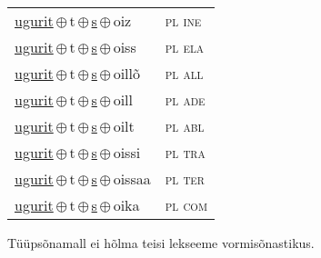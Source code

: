 \begin{minipage}{\textwidth}
\begin{sideways}
\begin{tabular}{l l}
\underline{ugurit}\,$\oplus$\,t\,$\oplus$\,\underline{s}\,$\oplus$\,oiz & \textsc{ pl ine } \\
\underline{ugurit}\,$\oplus$\,t\,$\oplus$\,\underline{s}\,$\oplus$\,oiss & \textsc{ pl ela } \\
\underline{ugurit}\,$\oplus$\,t\,$\oplus$\,\underline{s}\,$\oplus$\,oillõ & \textsc{ pl all } \\
\underline{ugurit}\,$\oplus$\,t\,$\oplus$\,\underline{s}\,$\oplus$\,oill & \textsc{ pl ade } \\
\underline{ugurit}\,$\oplus$\,t\,$\oplus$\,\underline{s}\,$\oplus$\,oilt & \textsc{ pl abl } \\
\underline{ugurit}\,$\oplus$\,t\,$\oplus$\,\underline{s}\,$\oplus$\,oissi & \textsc{ pl tra } \\
\underline{ugurit}\,$\oplus$\,t\,$\oplus$\,\underline{s}\,$\oplus$\,oissaa & \textsc{ pl ter } \\
\underline{ugurit}\,$\oplus$\,t\,$\oplus$\,\underline{s}\,$\oplus$\,oika & \textsc{ pl com } \\
\end{tabular}
\end{sideways}
\label{tab:tüüpsõnamall-ugurittsõ}

\end{minipage}

 
\vspace{1em}
\noindent Tüüpsõnamall  ei hõlma teisi lekseeme vormi\-sõnastikus.
